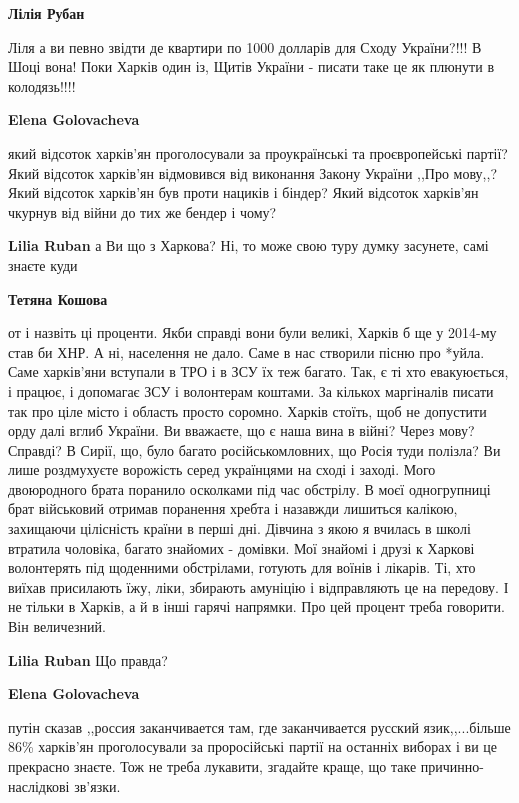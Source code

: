 \begin{itemize}
\begin{itemize}
\textbf{Лілія Рубан} 

Ліля а ви певно звідти де квартири по 1000 долларів для Сходу України?!!! В
Шоці вона! Поки Харків один із, Щитів України - писати таке це як плюнути в
колодязь!!!!

\textbf{Elena Golovacheva} 

який відсоток харків'ян проголосували за проукраїнські та проєвропейські
партії? Який відсоток харків'ян відмовився від виконання Закону України ,,Про
мову,,? Який відсоток харків'ян був проти нациків і біндер? Який відсоток
харків'ян чкурнув від війни до тих же бендер і чому?

\textbf{Lilia Ruban} а Ви що з Харкова? Ні, то може свою туру думку засунете, самі знаєте куди

\textbf{Тетяна Кошова} 

от і назвіть ці проценти. Якби справді вони були великі, Харків б ще у 2014-му
став би ХНР. А ні, населення не дало. Саме в нас створили пісню про *уйла. Саме
харків'яни вступали в ТРО і в ЗСУ їх теж багато. Так, є ті хто евакуюється, і
працює, і допомагає ЗСУ і волонтерам коштами. За кількох маргіналів писати так
про ціле місто і область просто соромно. Харків стоїть, щоб не допустити орду
далі вглиб України. Ви вважаєте, що є наша вина в війні? Через мову? Справді? В
Сирії, що, було багато російськомловних, що Росія туди полізла? Ви лише
роздмухуєте ворожість серед українцями на сході і заході. Мого двоюродного
брата поранило осколками під час обстрілу. В моєї одногрупниці брат військовий
отримав поранення хребта і назавжди лишиться калікою, захищаючи цілісність
країни в перші дні. Дівчина з якою я вчилась в школі втратила чоловіка, багато
знайомих - домівки. Мої знайомі і друзі к Харкові волонтерять під щоденними
обстрілами, готують для воїнів і лікарів. Ті, хто виїхав присилають їжу, ліки,
збирають амуніцію і відправляють це на передову. І не тільки в Харків, а й в
інші гарячі напрямки. Про цей процент треба говорити. Він величезний.

\textbf{Lilia Ruban} Що правда?

\textbf{Elena Golovacheva} 

путін сказав ,,россия заканчивается там, где заканчивается русский
язик,,...більше 86\% харків'ян проголосували за проросійські партії на останніх
виборах і ви це прекрасно знаєте. Тож не треба лукавити, згадайте краще, що
таке причинно-наслідкові зв'язки.


\end{itemize}
\end{itemize}

